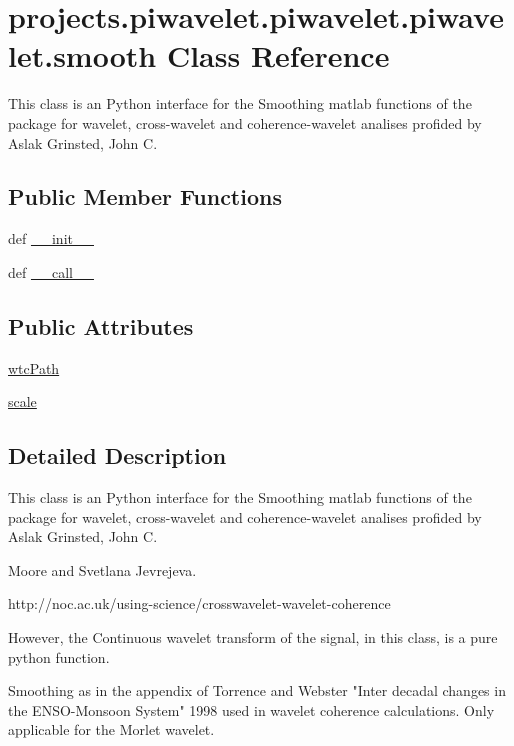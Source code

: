 \hypertarget{classprojects_1_1piwavelet_1_1piwavelet_1_1piwavelet_1_1smooth}{\section{projects.\-piwavelet.\-piwavelet.\-piwavelet.\-smooth Class Reference}
\label{classprojects_1_1piwavelet_1_1piwavelet_1_1piwavelet_1_1smooth}
}


This class is an Python interface for the Smoothing matlab functions of the package for wavelet, cross-\/wavelet and coherence-\/wavelet analises profided by Aslak Grinsted, John C.  


\subsection*{Public Member Functions}
\begin{DoxyCompactItemize}
\item 
def \hyperlink{classprojects_1_1piwavelet_1_1piwavelet_1_1piwavelet_1_1smooth_a205b05c98f907abd35751d5c5ce8c5fb}{\-\_\-\-\_\-init\-\_\-\-\_\-}
\item 
def \hyperlink{classprojects_1_1piwavelet_1_1piwavelet_1_1piwavelet_1_1smooth_acc53387040fbd2ea2669ae63d7f237da}{\-\_\-\-\_\-call\-\_\-\-\_\-}
\end{DoxyCompactItemize}
\subsection*{Public Attributes}
\begin{DoxyCompactItemize}
\item 
\hyperlink{classprojects_1_1piwavelet_1_1piwavelet_1_1piwavelet_1_1smooth_a6c6d2bf5f8515fa43e012a567b44aab3}{wtc\-Path}
\item 
\hyperlink{classprojects_1_1piwavelet_1_1piwavelet_1_1piwavelet_1_1smooth_a367a5c417ed5d4e2da1026b43f47cd07}{scale}
\end{DoxyCompactItemize}


\subsection{Detailed Description}
This class is an Python interface for the Smoothing matlab functions of the package for wavelet, cross-\/wavelet and coherence-\/wavelet analises profided by Aslak Grinsted, John C. 

Moore and Svetlana Jevrejeva. \begin{DoxyVerb}http://noc.ac.uk/using-science/crosswavelet-wavelet-coherence

However, the Continuous wavelet transform of the signal, in this class, is a pure python
function.

Smoothing as in the appendix of Torrence and Webster "Inter decadal changes in the ENSO-Monsoon System" 1998 
used in wavelet coherence calculations. Only applicable for the Morlet wavelet. \end{DoxyVerb}
 

